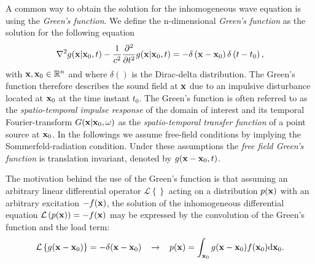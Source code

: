 A common way to obtain the solution for the inhomogeneous wave equation is using the \emph{Green's function}. We define the n-dimensional \emph{Green's function} as the solution for the following equation \cite{Gumerov2004, Williams1999}
\begin{equation}
\nabla^2 g(\mathbf{x}|\mathbf{x}_0,t) -\frac{1}{c^2}\frac{\partial^2}{\partial t^2} g(\mathbf{x}|\mathbf{x}_0,t) = -\delta\left( \mathbf{x} - \mathbf{x}_0 \right)\delta\left( t - t_0 \right),
\label{Eq:Theory:Green_function_def}
\end{equation}
with $\mathbf{x}, \mathbf{x}_0 \in \mathbb{R}^{n}$ and where $\delta()$ is the Dirac-delta distribution. The Green's function therefore describes the sound field at $\mathbf{x}$ due to an impulsive disturbance located at $\mathbf{x}_0$ at the time instant $t_0$.
The Green's function is often referred to as the \emph{spatio-temporal impulse response} of the domain of interest and its temporal Fourier-transform $G(\mathbf{x}|\mathbf{x}_0,\omega)$ as the \emph{spatio-temporal transfer function} of a point source at $\mathbf{x}_0$. In the followings we assume free-field conditions by implying the Sommerfeld-radiation condition. Under these assumptions the \emph{free field Green's function} is translation invariant, denoted by $g(\mathbf{x}-\mathbf{x}_0,t)$.

The motivation behind the use of the Green's function is that assuming an arbitrary linear differential operator $\mathcal{L}\left\{ \right\}$ acting on a distribution $p(\mathbf{x})$ with an arbitrary excitation $-f(\mathbf{x})$, the solution of the inhomogeneous differential equation $\mathcal{L}\left(p(\mathbf{x})\right) = -f(\mathbf{x})$ may be expressed by the convolution of the Green's function and the load term:
\begin{equation}
\mathcal{L}\left\{ g(\mathbf{x}-\mathbf{x}_0) \right\} = -\delta( \mathbf{x}-\mathbf{x}_0 ) \hspace{3mm} \rightarrow \hspace{3mm}
p(\mathbf{x}) = \int_{\mathbf{x}_0 }  g(\mathbf{x}-\mathbf{x}_0) f(\mathbf{x}_0) \mathrm{d} \mathbf{x}_0.
\label{Eq:Theory:Basic_Green_function_eq}
\end{equation}

